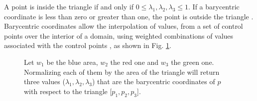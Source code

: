 A point is inside the triangle if and only if $0 \leq \lambda_1, \lambda_2, \lambda_3 \leq 1$. If a barycentric coordinate is less than zero or greater than one, the point is outside the triangle \cite{SLIDE:ICORSI}.
Barycentric coordinates allow the interpolation of values, from a set of control points over the interior of a domain, using weighted combinations of values associated with the control points \cite{REPORT:localbarycentricoordsepfl}, as shown in Fig. \ref{fig:barycentric-coord}.
\begin{figure}[h!]
  \centering
    \caption{Let $w_1$ be the blue area, $w_2$ the red one and $w_3$ the green one. Normalizing each of them by the area of the triangle will return three values ($\lambda_1, \lambda_2, \lambda_3$) that are the barycentric coordinates of $p$ with respect to the triangle [$p_1, p_2, p_3$].}
    \label{fig:barycentric-coord}
  \end{figure}


